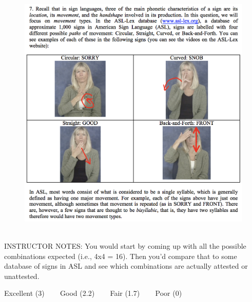 \documentclass[12pt]{article}
\begin{document}
\begin{figure}[H]
\includegraphics{../images/ASL_movement.png}
\end{figure}

~\\
INSTRUCTOR NOTES: You would start by coming up with all the possible combinations expected (i.e., 4x4 = 16). Then you'd compare that to some database of signs in ASL and see which combinations are actually attested or unattested.


\vfill
Excellent (3) ~~~ Good (2.2) ~~~ Fair (1.7) ~~~ Poor (0)
\newpage

\begin{center}
\textbf{{\color{red}{\HUGE END OF EXAM}}}\\

\end{center}
\newpage

\begin{center}
\textbf{{\color{blue}{\HUGE START OF EXAM\\}}}

\textbf{{\color{blue}{\HUGE Student ID: 59669\\}}}

\textbf{{\color{blue}{\HUGE 4:20\\}}}

\end{center}
\newpage
\end{document}
